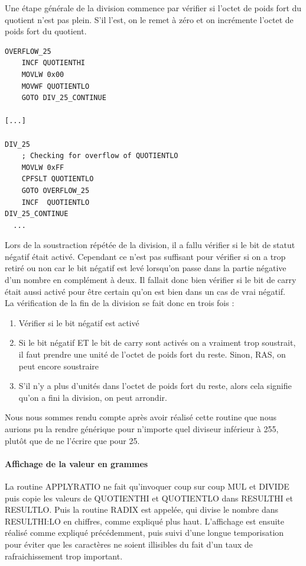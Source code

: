 \documentclass[a4paper,11pt,titlepage]{article}
\begin{document}
Une étape générale de la division commence par vérifier si l'octet de poids fort du quotient n'est pas plein. S'il l'est, on le remet à zéro et on incrémente l'octet de poids fort du quotient.\\

\begin{lstlisting}
OVERFLOW_25
    INCF QUOTIENTHI
    MOVLW 0x00
    MOVWF QUOTIENTLO
    GOTO DIV_25_CONTINUE

[...]

DIV_25
    ; Checking for overflow of QUOTIENTLO
    MOVLW 0xFF
    CPFSLT QUOTIENTLO
    GOTO OVERFLOW_25
    INCF  QUOTIENTLO	
DIV_25_CONTINUE
  ...
\end{lstlisting}


Lors de la soustraction répétée de la division, il a fallu vérifier si le bit de statut négatif était activé. Cependant ce n'est pas suffisant pour vérifier si on a trop retiré ou non car le bit négatif est levé lorsqu'on passe dans la partie négative d'un nombre en complément à deux. Il fallait donc bien vérifier si le bit de carry était aussi activé pour être certain qu'on est bien dans un cas de vrai négatif.\\

La vérification de la fin de la division se fait donc en trois fois :

\begin{enumerate}
  \item Vérifier si le bit négatif est activé
  \item Si le bit négatif ET le bit de carry sont activés on a vraiment trop soustrait, il faut prendre une unité de l'octet de poids fort du reste. Sinon, RAS, on peut encore soustraire
  \item S'il n'y a plus d'unités dans l'octet de poids fort du reste, alors cela signifie qu'on a fini la division, on peut arrondir.
\end{enumerate}

Nous nous sommes rendu compte après avoir réalisé cette routine que nous aurions pu la rendre générique pour n'importe quel diviseur inférieur à 255, plutôt que de ne l'écrire que pour 25.

\paragraph{Affichage de la valeur en grammes}

La routine APPLY\textunderscore RATIO ne fait qu'invoquer coup sur coup MUL et DIVIDE puis copie les valeurs de QUOTIENTHI et QUOTIENTLO dans RESULTHI et RESULTLO. Puis la routine RADIX est appelée, qui divise le nombre dans RESULTHI:LO en chiffres, comme expliqué plus haut. L'affichage est ensuite réalisé comme expliqué précédemment, puis suivi d'une longue temporisation pour éviter que les caractères ne soient illisibles du fait d'un taux de rafraichissement trop important.
\end{document}
